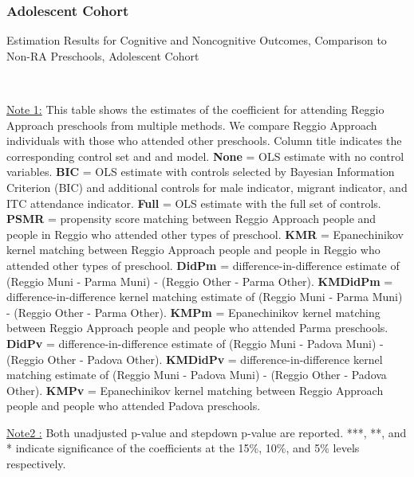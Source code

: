 \subsubsection{Adolescent Cohort}
\begin{table}[H] \caption{Estimation Results for Cognitive and Noncognitive Outcomes, Comparison to Non-RA Preschools, Adolescent Cohort} \label{ols-CN-adol-reg-reli}
\scalebox{0.6}{}
\vspace{1ex} \\
\footnotesize\raggedright{\underline{Note 1:} This table shows the estimates of the coefficient for attending Reggio Approach preschools from multiple methods. We compare Reggio Approach individuals with those who attended other preschools. Column title indicates the corresponding control set and and model. \textbf{None} = OLS estimate with no control variables. \textbf{BIC} = OLS estimate with controls selected by Bayesian Information Criterion (BIC) and additional controls for male indicator, migrant indicator, and ITC attendance indicator. \textbf{Full} = OLS estimate with the full set of controls. \textbf{PSMR} =  propensity score matching between Reggio Approach people and people in Reggio who attended other types of preschool. \textbf{KMR} = Epanechinikov kernel matching between Reggio Approach people and people in Reggio who attended other types of preschool. \textbf{DidPm} = difference-in-difference estimate of (Reggio Muni - Parma Muni) - (Reggio Other - Parma Other). \textbf{KMDidPm} = difference-in-difference kernel matching estimate of (Reggio Muni - Parma Muni) - (Reggio Other - Parma Other).   \textbf{KMPm} = Epanechinikov kernel matching between Reggio Approach people and people who attended Parma preschools. \textbf{DidPv} = difference-in-difference estimate of (Reggio Muni - Padova Muni) - (Reggio Other - Padova Other). \textbf{KMDidPv} = difference-in-difference kernel matching estimate of (Reggio Muni - Padova Muni) - (Reggio Other - Padova Other).  \textbf{KMPv} = Epanechinikov kernel matching between Reggio Approach people and people who attended Padova preschools.} 

\footnotesize\raggedright{\underline{Note2 :} Both unadjusted p-value and stepdown p-value are reported. ***, **, and * indicate significance of the coefficients at the 15\%, 10\%, and 5\% levels respectively.}
\end{table}


